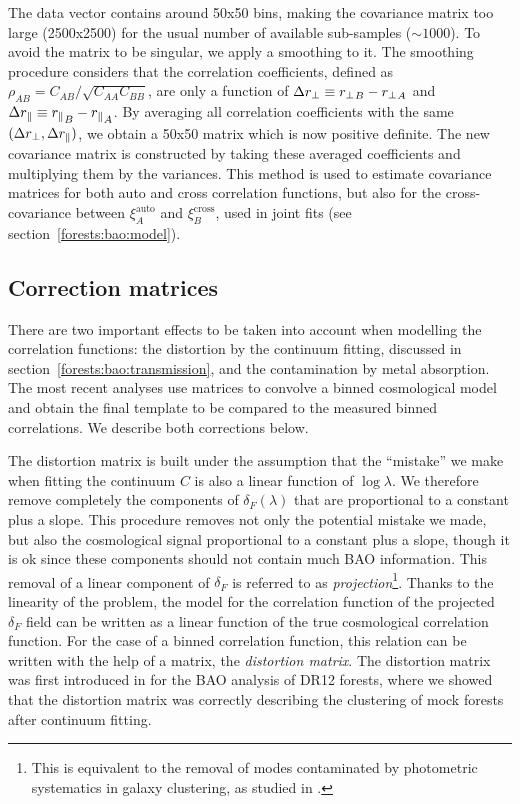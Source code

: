 The data vector contains around 50x50 bins, making the covariance matrix too large (2500x2500)
for the usual number of available sub-samples ($\sim 1000$). To avoid the matrix to be 
singular, we apply a smoothing to it. The smoothing procedure considers that the 
correlation coefficients, defined as $\rho_{AB} = C_{AB}/\sqrt{C_{AA} C_{BB}}$, 
are only a function of $\Delta {r_\perp} \equiv {r_\perp}_B - {r_\perp}_A$ and 
$\Delta {r_\parallel} \equiv {r_\parallel}_B - {r_\parallel}_A$. By averaging all correlation coefficients
with the same $(\Delta {r_\perp}, \Delta {r_\parallel})$, we obtain a 50x50 matrix which is now 
positive definite. The new covariance matrix is constructed by taking these averaged 
coefficients and multiplying them by the variances. This method is used to estimate 
covariance matrices for both auto and cross correlation functions, but also for the 
cross-covariance between $\xi^\mathrm{auto}_A$ and $\xi^\mathrm{cross}_B$, used in 
joint fits (see section~\ref{forests:bao:model}).



\subsection{Correction matrices}
\label{forests:bao:matrices}

There are two important effects to be taken into account when modelling 
the \lya correlation functions: the distortion by the continuum fitting, discussed 
in section~\ref{forests:bao:transmission}, and the contamination by metal 
absorption. The most recent analyses use matrices to convolve a binned 
cosmological model and obtain the final template to be compared to 
the measured binned correlations. We describe both corrections below. 

The distortion matrix is built under the assumption that the ``mistake''
we make when fitting the continuum $C$ is also a linear function 
of $\log \lambda$. We therefore remove completely the components of $\delta_F(\lambda)$
that are proportional to a constant plus a slope. This procedure removes
not only the potential mistake we made, 
but also the cosmological signal proportional to a constant plus a slope,
though it is ok since these components should not contain much BAO information.
This removal of a linear component of $\delta_F$ is referred to as 
\emph{projection}\footnote{This is equivalent to the removal of modes 
contaminated by photometric systematics in galaxy clustering, as studied 
in \cite{paviotAngularSystematicsfreeCosmological2022}.}.
Thanks to the linearity of the problem, the model for the correlation function of 
the projected $\delta_F$ field can be written as a linear function of the 
true cosmological correlation function. For the case of a binned correlation function, 
this relation can be written with the help of a matrix, the \emph{distortion matrix}.
The distortion matrix was first introduced in \cite{bautistaMeasurementBaryonAcoustic2017}
for the BAO analysis of DR12 forests, where we showed that the distortion matrix 
was correctly describing the clustering of mock forests after continuum fitting. 

